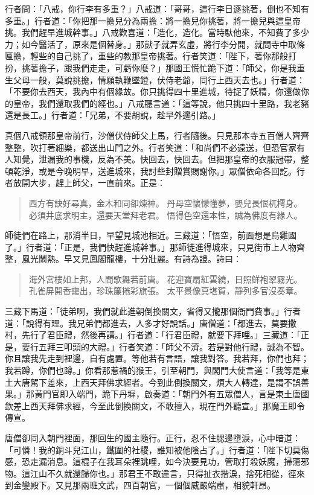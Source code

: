 行者問：「八戒，你行李有多重？」八戒道：「哥哥，這行李日逐挑著，倒也不知有多重。」行者道：「你把那一擔兒分為兩擔：將一擔兒你挑著，將一擔兒與這皇帝挑。我們趕早進城幹事。」八戒歡喜道：「造化，造化。當時馱他來，不知費了多少力；如今醫活了，原來是個替身。」那獃子就弄玄虛，將行李分開，就問寺中取條匾擔，輕些的自己挑了，重些的教那皇帝挑著。行者笑道：「陛下，著你那般打扮，挑著擔子，跟我們走走，可虧你麼？」那國王慌忙跪下道：「師父，你是我重生父母一般，莫說挑擔，情願執鞭墜鐙，伏侍老爺，同行上西天去也。」行者道：「不要你去西天，我內中有個緣故。你只挑得四十里進城，待捉了妖精，你還做你的皇帝，我們還取我們的經也。」八戒聽言道：「這等說，他只挑四十里路，我老豬還是長工。」行者道：「兄弟，不要胡說，趁早外邊引路。」

真個八戒領那皇帝前行，沙僧伏侍師父上馬，行者隨後。只見那本寺五百僧人齊齊整整，吹打著細樂，都送出山門之外。行者笑道：「和尚們不必遠送，但恐官家有人知覺，泄漏我的事機，反為不美。快回去，快回去。但把那皇帝的衣服冠帶，整頓乾淨，或是今晚明早，送進城來，我討些封贈賞賜謝你。」眾僧依命各回訖。行者放開大步，趕上師父，一直前來。正是：
\begin{quote}
西方有訣好尋真，金木和同卻煉神。
丹母空懷懞懂夢，嬰兒長恨杌樗身。
必須井底求明主，還要天堂拜老君。
悟得色空還本性，誠為佛度有緣人。
\end{quote}

師徒們在路上，那消半日，早望見城池相近。三藏道：「悟空，前面想是烏雞國了。」行者道：「正是，我們快趕進城幹事。」那師徒進得城來，只見街市上人物齊整，風光鬧熱。早又見鳳閣龍樓，十分壯麗。有詩為證。詩曰：
\begin{quote}
海外宮樓如上邦，人間歌舞若前唐。
花迎寶扇紅雲繞，日照鮮袍翠霧光。
孔雀屏開香靄出，珍珠簾捲彩旗張。
太平景像真堪賀，靜列多官沒奏章。
\end{quote}

三藏下馬道：「徒弟啊，我們就此進朝倒換關文，省得又攏那個衙門費事。」行者道：「說得有理。我兄弟們都進去，人多才好說話。」唐僧道：「都進去，莫要撒村，先行了君臣禮，然後再講。」行者道：「行君臣禮，就要下拜哩。」三藏道：「正是，要行五拜三叩頭的大禮。」行者笑道：「師父不濟。若是對他行禮，誠為不智。你且讓我先走到裡邊，自有處置。等他若有言語，讓我對答。我若拜，你們也拜；我若蹲，你們也蹲。」你看那惹禍的猴王，引至朝門，與閣門大使言道：「我等是東土大唐駕下差來，上西天拜佛求經者。今到此倒換關文，煩大人轉達，是謂不誤善果。」那黃門官即入端門，跪下丹墀，啟奏道：「朝門外有五眾僧人，言是東土唐國欽差上西天拜佛求經，今至此倒換關文，不敢擅入，現在門外聽宣。」那魔王即令傳宣。

唐僧卻同入朝門裡面，那回生的國主隨行。正行，忍不住腮邊墮淚，心中暗道：「可憐！我的銅斗兒江山，鐵圍的社稷，誰知被他陰占了。」行者道：「陛下切莫傷感，恐走漏消息。這棍子在我耳朵裡跳哩，如今決要見功，管取打殺妖魔，掃蕩邪物。這江山不久就還歸你也。」那君王不敢違言，只得扯衣揩淚，捨死相從，徑來到金鑾殿下。又見那兩班文武，四百朝官，一個個威嚴端肅，相貌軒昂。

